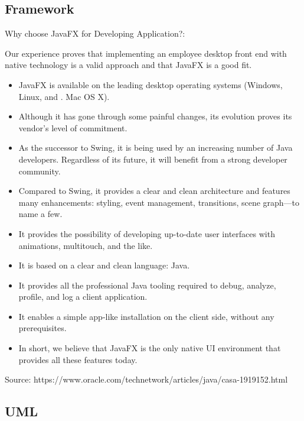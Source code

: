\documentclass[a4paper,10pt]{article}
\begin{document}
\paragraph{}


\subsection{Framework} 
Why choose JavaFX for Developing Application?:

Our experience proves that implementing an employee desktop front end with native technology is a valid approach and that JavaFX is a good fit.
\begin{itemize}
	\item JavaFX is available on the leading desktop operating systems (Windows, Linux, and . Mac OS X).
	\item Although it has gone through some painful changes, its evolution proves its       vendor's level of commitment.
	\item As the successor to Swing, it is being used by an increasing number of Java developers. Regardless of its future, it will benefit from a strong developer community.
	\item Compared to Swing, it provides a clear and clean architecture and features many enhancements: styling, event management, transitions, scene graph—to name a few.
	\item It provides the possibility of developing up-to-date user interfaces with animations, multitouch, and the like.
	\item It is based on a clear and clean language: Java.
	\item It provides all the professional Java tooling required to debug, analyze, profile, and log a client application.
	\item It enables a simple app-like installation on the client side, without any prerequisites.
	\item In short, we believe that JavaFX is the only native UI environment that provides all these features today.
\end{itemize}

Source: https://www.oracle.com/technetwork/articles/java/casa-1919152.html
\paragraph{}




\subsection{UML} 
\end{document}

